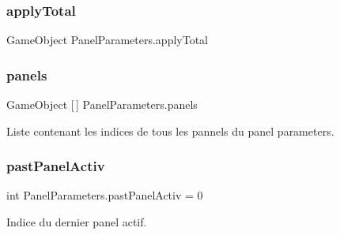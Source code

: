 \subsubsection{\texorpdfstring{apply\+Total}{applyTotal}}
{\footnotesize\ttfamily Game\+Object Panel\+Parameters.\+apply\+Total\hspace{0.3cm}{\ttfamily [private]}}

\mbox{\label{class_panel_parameters_a3acf3dbb1cd826f3c73e8111b5cf8049}} 
\subsubsection{\texorpdfstring{panels}{panels}}
{\footnotesize\ttfamily Game\+Object \mbox{[}$\,$\mbox{]} Panel\+Parameters.\+panels\hspace{0.3cm}{\ttfamily [private]}}



Liste contenant les indices de tous les pannels du panel parameters. 

\mbox{\label{class_panel_parameters_ad8f000554f0e689f3147268570ab50e7}} 
\subsubsection{\texorpdfstring{past\+Panel\+Activ}{pastPanelActiv}}
{\footnotesize\ttfamily int Panel\+Parameters.\+past\+Panel\+Activ = 0\hspace{0.3cm}{\ttfamily [private]}}



Indice du dernier panel actif. 


